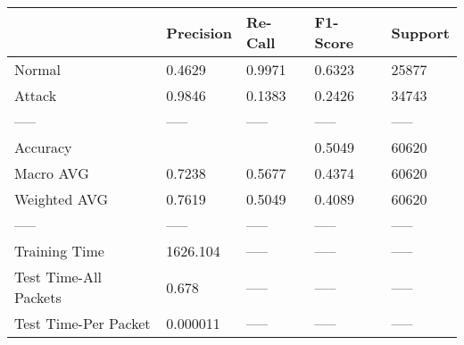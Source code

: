 \begin{tabular}{lllll}
\toprule
{} & Precision & Re-Call & F1-Score & Support \\
\midrule
Normal                &    0.4629 &  0.9971 &   0.6323 &   25877 \\
Attack                &    0.9846 &  0.1383 &   0.2426 &   34743 \\
-----                 &     ----- &   ----- &    ----- &   ----- \\
Accuracy              &           &         &   0.5049 &   60620 \\
Macro AVG             &    0.7238 &  0.5677 &   0.4374 &   60620 \\
Weighted AVG          &    0.7619 &  0.5049 &   0.4089 &   60620 \\
-----                 &     ----- &   ----- &    ----- &   ----- \\
Training Time         &  1626.104 &   ----- &    ----- &   ----- \\
Test Time-All Packets &     0.678 &   ----- &    ----- &   ----- \\
Test Time-Per Packet  &  0.000011 &   ----- &    ----- &   ----- \\
\bottomrule
\end{tabular}

